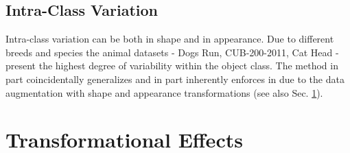 	\subsection{Intra-Class Variation}\label{sec:intraclass}
		Intra-class variation can be both in shape and in appearance. Due to different breeds and species the animal datasets - Dogs Run, CUB-200-2011, Cat Head - present the highest degree of variability within the object class. The method in part coincidentally generalizes and in part inherently enforces in due to the data augmentation with shape and appearance transformations (see also Sec. \ref{sec:transformations}).


\section{Transformational Effects}\label{sec:transformations}


